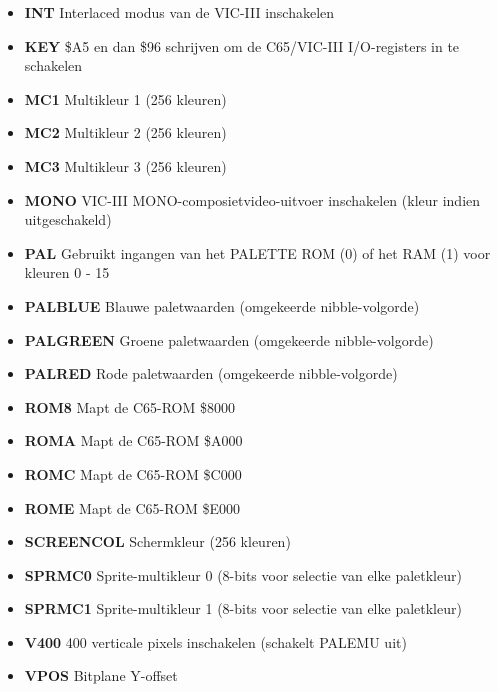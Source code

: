 \begin{itemize}
\item{\bf{INT}} Interlaced modus van de VIC-III inschakelen
\item{\bf{KEY}} \$A5 en dan \$96 schrijven om de C65/VIC-III I/O-registers in te schakelen
\item{\bf{MC1}} Multikleur 1 (256 kleuren)
\item{\bf{MC2}} Multikleur 2 (256 kleuren)
\item{\bf{MC3}} Multikleur 3 (256 kleuren)
\item{\bf{MONO}} VIC-III MONO-composietvideo-uitvoer inschakelen (kleur indien uitgeschakeld)
\item{\bf{PAL}} Gebruikt ingangen van het PALETTE ROM (0) of het RAM (1) voor kleuren 0 - 15
\item{\bf{PALBLUE}} Blauwe paletwaarden (omgekeerde nibble-volgorde)
\item{\bf{PALGREEN}} Groene paletwaarden (omgekeerde nibble-volgorde)
\item{\bf{PALRED}} Rode paletwaarden (omgekeerde nibble-volgorde)
\item{\bf{ROM8}} Mapt de C65-ROM \@ \$8000
\item{\bf{ROMA}} Mapt de C65-ROM \@ \$A000
\item{\bf{ROMC}} Mapt de C65-ROM \@ \$C000
\item{\bf{ROME}} Mapt de C65-ROM \@ \$E000
\item{\bf{SCREENCOL}} Schermkleur (256 kleuren)
\item{\bf{SPRMC0}} Sprite-multikleur 0 (8-bits voor selectie van elke paletkleur)
\item{\bf{SPRMC1}} Sprite-multikleur 1 (8-bits voor selectie van elke paletkleur)
\item{\bf{V400}} 400 verticale pixels inschakelen (schakelt PALEMU uit)
\item{\bf{VPOS}} Bitplane Y-offset
\end{itemize}
